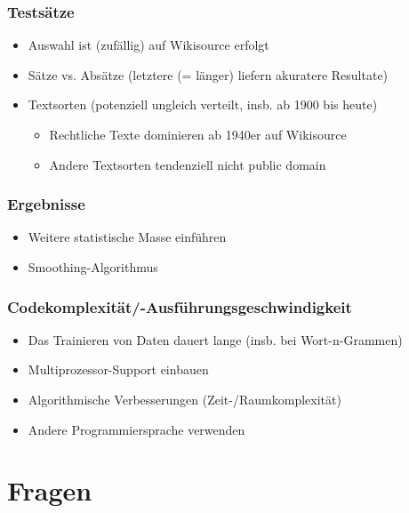 \documentclass[t]{beamer} %
\begin{document}
\begin{frame}
  \frametitle{Testsätze}
  \begin{itemize}
  \item Auswahl ist (zufällig) auf Wikisource erfolgt\pause
  \vspace*{1ex}
  \item Sätze vs. Absätze (letztere (= länger) liefern akuratere Resultate)\pause
  \item Textsorten (potenziell ungleich verteilt, insb. ab 1900 bis heute)\pause
  \begin{itemize}
   \item Rechtliche Texte dominieren ab 1940er auf Wikisource
   \item Andere Textsorten tendenziell nicht public domain
  \end{itemize}
  \end{itemize}  
\end{frame}

\begin{frame}
  \frametitle{Ergebnisse}
  \begin{itemize}
  \item Weitere statistische Masse einführen\pause
  \item Smoothing-Algorithmus\pause
  \end{itemize}  
\end{frame}

\begin{frame}
  \frametitle{Codekomplexität/-Ausführungsgeschwindigkeit}
  \begin{itemize}
  \item Das Trainieren von Daten dauert lange (insb. bei Wort-n-Grammen)\pause
  \vspace*{1ex}
  \item Multiprozessor-Support einbauen\pause
  \item Algorithmische Verbesserungen (Zeit-/Raumkomplexität)\pause
  \item Andere Programmiersprache verwenden\pause
  \vspace*{1ex}
  \end{itemize}  
\end{frame}

\section{Fragen}
\end{document}
